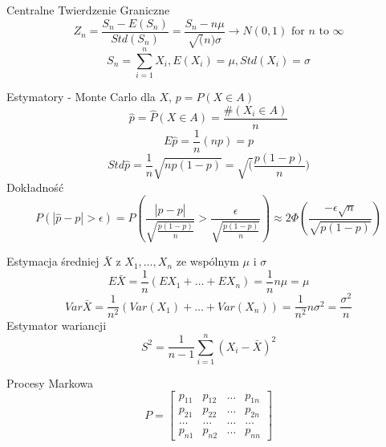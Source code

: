 \documentclass[a4paper]{article}
\begin{document}
    Centralne Twierdzenie Graniczne
    \begin{equation}
        Z_n = \frac{S_n - E(S_n)}{Std(S_n)} = \frac{S_n - n \mu}{\sqrt(n) \sigma} \rightarrow N(0,1) \text{ for } n \text{ to } \infty
    \end{equation}
    \begin{equation*}
        S_n = \sum_{i=1}^n X_i, E(X_i) = \mu, Std(X_i) = \sigma
    \end{equation*}

    Estymatory - Monte Carlo
    dla $X$, $p = P(X \in A)$
    \begin{equation*}
        \hat{p} = \hat{P}(X \in A) = \frac{\#(X_i \in A)}{n}
    \end{equation*}
    \begin{equation*}
        E \hat{p} = \frac{1}{n} (np) = p
    \end{equation*}
    \begin{equation*}
        Std \hat{p} = \frac{1}{n}\sqrt{np(1-p)} = \sqrt(\frac{p(1-p)}{n})
    \end{equation*}
    Dokładność
    \begin{equation*}
        P(|\hat{p} - p| > \epsilon) = P(\frac{|\hat{p} - p|}{\sqrt{\frac{p(1-p)}{n}}} > \frac{\epsilon}{\sqrt{\frac{p(1-p)}{n}}})
        \approx 2 \Phi( \frac{-\epsilon \sqrt{n}}{\sqrt{p(1-p)}})
    \end{equation*}

    Estymacja średniej $\bar{X}$ z $X_1, \dots, X_n$ ze wspólnym $\mu$ i $\sigma$
    \begin{equation*}
        E \bar{X} = \frac{1}{n} (EX_1 + \dots + EX_n) = \frac{1}{n} n\mu = \mu
    \end{equation*}
    \begin{equation*}
        Var \bar{X} = \frac{1}{n^2} (Var(X_1) + \dots + Var(X_n)) = \frac{1}{n^2} n\sigma^2 = \frac{\sigma^2}{n}
    \end{equation*}
    Estymator wariancji
    \begin{equation*}
        S^2 = \frac{1}{n-1} \sum_{i=1}^{n} (X_i - \bar{X})^2
    \end{equation*}

    Procesy Markowa
    \begin{equation*}
        P =
        \begin{bmatrix}
            p_{1 1} & p_{1 2} & \dots & p_{1 n}\\
            p_{2 1} & p_{2 2} & \dots & p_{2 n}\\
            \dots & \dots & \dots & \dots\\
            p_{n 1} & p_{n 2} & \dots & p_{n n}
        \end{bmatrix}
    \end{equation*}
\end{document}
